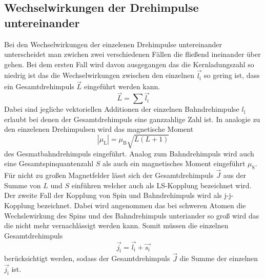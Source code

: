 \subsection{Wechselwirkungen der Drehimpulse untereinander}
Bei den Wechselwirkungen der einzelenen Drehimpulse untereinander unterscheidet man zwichen zwei verschiedenen Fällen die fließend ineinander über gehen.  Bei dem ersten Fall wird davon ausgegangen das die Kernladungszahl so niedrig ist das die Wechselwirkungen zwischen den einzelnen $\vec{l_\text{i}}$ so gering ist, dass ein Gesamtdrehimpuls $\vec{L}$ eingeführt werden kann.
\begin{equation}
  \vec{L} = \sum \vec{l_\text{i}}
  \label{eqn:L}
\end{equation}
Dabei sind jegliche vektoriellen Additionen der einzelnen Bahndrehimpulse $l_\text{l}$ erlaubt bei denen der Gesamtdrehimpuls eine ganzzahlige Zahl ist. In analogie zu den einzelenen Drehimpulsen wird das magnetische Moment
\begin{equation}
  |\mu_\text{L}| = \mu_\text{B} \sqrt{L(L+1)}
  \label{magL}
\end{equation}
des Gesmatbahndrehimpuls eingeführt. Analog zum Bahndrehimpuls wird auch eine Gesamtspinquantenzahl $S$ als auch ein magnetisches Moment eingeführt $\mu_\text{S}$. Für nicht zu großen Magnetfelder lässt sich der Gesamtdrehimpuls $\vec{J}$ aus der Summe von $L$ und $S$ einführen welcher auch als LS-Kopplung bezeichnet wird.
Der zweite Fall der Kopplung von Spin und Bahndrehimpuls wird als j-j-Kopplung bezeichnet. Dabei wird angenommen das bei schweren Atomen die Wechslewirkung des Spins und des Bahndrehimpuls unteriander so groß wird das die nicht mehr vernachlässigt werden kann. Somit müssen die einzelnen Gesamtdrehimpuls 
\begin{equation}
  \vec{j_\text{i}} = \vec{l_\text{i}} + \vec{s_\text{i}}
  \label{eqn:j}
\end{equation}
berücksichtigt werden, sodass der Gesamtdrehimpuls $\vec{J}$ die Summe der einzelnen $\vec{j_\text{i}}$ ist. 

